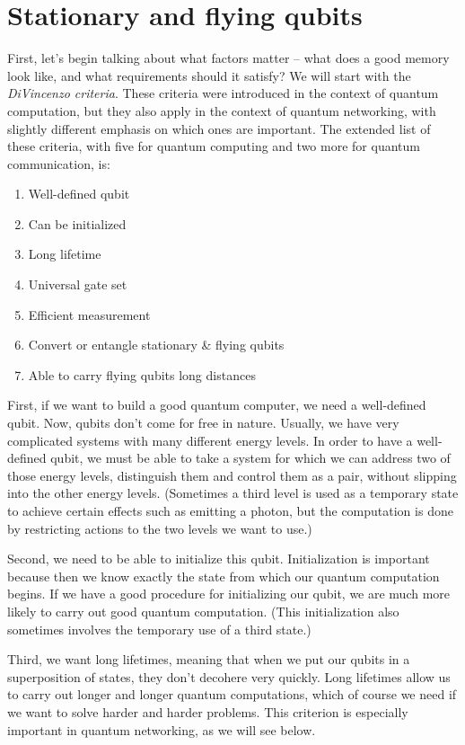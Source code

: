 \section{Stationary and flying qubits}

First, let's begin talking about what factors matter -- what does a good memory look like, and what requirements should it satisfy?  We will start with the \emph{DiVincenzo criteria}. These criteria were introduced in the context of quantum computation, but they also apply in the context of quantum networking, with slightly different emphasis on which ones are important.  The extended list of these criteria, with five for quantum computing and two more for quantum communication, is:

\begin{enumerate}
    \item Well-defined qubit
    \item Can be initialized
    \item Long lifetime
    \item Universal gate set
    \item Efficient measurement
    \item Convert or entangle stationary \& flying qubits
    \item Able to carry flying qubits long distances
\end{enumerate}

First, if we want to build a good quantum computer, we need a well-defined qubit. Now, qubits don't come for free in nature. Usually, we have very complicated systems with many different energy levels. In order to have a well-defined qubit, we must be able to take a system for which we can address two of those energy levels, distinguish them and control them as a pair, without slipping into the other energy levels.  (Sometimes a third level is used as a temporary state to achieve certain effects such as emitting a photon, but the computation is done by restricting actions to the two levels we want to use.)

Second, we need to be able to initialize this qubit. Initialization is important because then we know exactly the state from which our quantum computation begins. If we have a good procedure for initializing our qubit, we are much more likely to carry out good quantum computation.  (This initialization also sometimes involves the temporary use of a third state.)

Third, we want long lifetimes, meaning that when we put our qubits in a superposition of states, they don't decohere very quickly. Long lifetimes allow us to carry out longer and longer quantum computations, which of course we need if we want to solve harder and harder problems.  This criterion is especially important in quantum networking, as we will see below.

